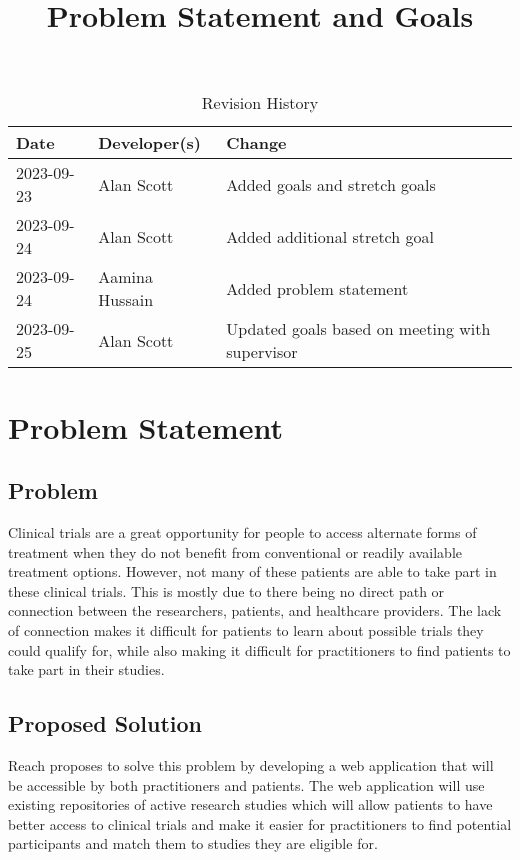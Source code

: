 \documentclass{article}
\title{Problem Statement and Goals\\\progname}
\author{\authname}
\date{}
\begin{document}
\maketitle

\begin{table}[hp]
\caption{Revision History} \label{TblRevisionHistory}
\begin{tabularx}{\textwidth}{llX}
\toprule
\textbf{Date} & \textbf{Developer(s)} & \textbf{Change}\\
\midrule
2023-09-23 & Alan Scott & Added goals and stretch goals\\
2023-09-24 & Alan Scott & Added additional stretch goal \\
2023-09-24 & Aamina Hussain & Added problem statement \\
2023-09-25 & Alan Scott & Updated goals based on meeting with supervisor \\
\bottomrule
\end{tabularx}
\end{table}

\section{Problem Statement}


\subsection{Problem}
Clinical trials are a great opportunity for people to access alternate forms of treatment when they do not benefit 
from conventional or readily available treatment options. However, not many of these patients are able to take part 
in these clinical trials. This is mostly due to there being no direct path or connection between the researchers, patients, 
and healthcare providers. The lack of connection makes it difficult for patients to learn about possible trials they could 
qualify for, while also making it difficult for practitioners to find patients to take part in their studies.

\subsection{Proposed Solution}
Reach proposes to solve this problem by developing a web application that will be accessible by both practitioners 
and patients. The web application will use existing repositories of active research studies which will allow patients to 
have better access to clinical trials and make it easier for practitioners to find potential participants and match them to 
studies they are eligible for.
\end{document}

